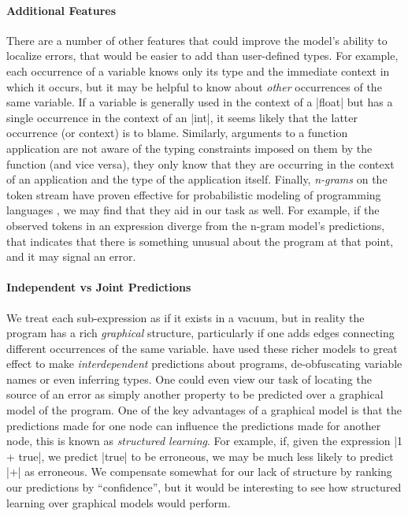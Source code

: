 \paragraph{Additional Features}
There are a number of other features that could improve the model's
ability to localize errors, that would be easier to add than
user-defined types.
%
For example, each occurrence of a variable knows only its type and the
immediate context in which it occurs, but it may be helpful to know
about \emph{other} occurrences of the same variable.
%
If a variable is generally used in the context of a |float| but has a
single occurrence in the context of an |int|, it seems likely that the
latter occurrence (or context) is to blame.
%
Similarly, arguments to a function application are not aware of the
typing constraints imposed on them by the function (and vice versa),
they only know that they are occurring in the context of an application
and the type of the application itself.
%
Finally, \emph{n-grams} on the token stream have proven effective for
probabilistic modeling of programming languages
\citep{Hindle2012-hf,Gabel2010-el}, we may find that they aid in
our task as well.
%
For example, if the observed tokens in an expression diverge from the
n-gram model's predictions, that indicates that there is something
unusual about the program at that point, and it may signal an error.


\paragraph{Independent vs Joint Predictions}
We treat each sub-expression as if it exists in a vacuum, but in reality
the program has a rich \emph{graphical} structure, particularly if one adds
edges connecting different occurrences of the same variable.
%
\citet{Raychev2015-jg} have used these richer models to great effect to
make \emph{interdependent} predictions about programs, \eg
de-obfuscating variable names or even inferring types.
%
One could even view our task of locating the source of an error as simply
another property to be predicted over a graphical model of the program.
%
One of the key advantages of a graphical model is that the predictions
made for one node can influence the predictions made for another node,
this is known as \emph{structured learning}.
%
For example, if, given the expression |1 + true|, we predict |true| to
be erroneous, we may be much less likely to predict |+| as erroneous.
%
We compensate somewhat for our lack of structure by ranking our
predictions by ``confidence'', but it would be interesting to see how
structured learning over graphical models would perform.




